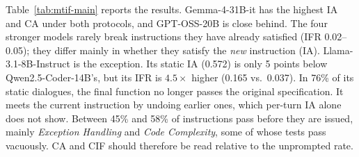 Table~\ref{tab:mtif-main} reports the results. Gemma-4-31B-it has the highest
IA and CA under both protocols, and GPT-OSS-20B is close behind. The four
stronger models rarely break instructions they have already satisfied
(IFR 0.02--0.05); they differ mainly in whether they satisfy the \emph{new}
instruction (IA). Llama-3.1-8B-Instruct is the exception. Its static IA
(0.572) is only 5 points below Qwen2.5-Coder-14B's, but its IFR is
$4.5\times$ higher (0.165 vs.\ 0.037). In 76\% of its static dialogues, the
final function no longer passes the original specification. It meets the
current instruction by undoing earlier ones, which per-turn IA alone does not
show. Between 45\% and 58\% of instructions pass before they are issued, mainly
\emph{Exception Handling} and \emph{Code Complexity}, some of whose tests pass
vacuously. CA and CIF should therefore be read relative to the unprompted
rate.
